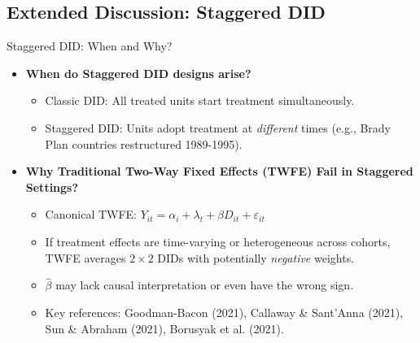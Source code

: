 \documentclass{beamer}
\begin{document}
\subsection{Extended Discussion: Staggered DID}
\begin{frame}{Staggered DID: When and Why?}
  \begin{itemize}
    \item \textbf{When do Staggered DID designs arise?}
    \begin{itemize}
        \item Classic DID: All treated units start treatment simultaneously.
        \item Staggered DID: Units adopt treatment at \textit{different} times (e.g., Brady Plan countries restructured 1989-1995).
    \end{itemize}
    \item \textbf{Why Traditional Two-Way Fixed Effects (TWFE) Fail in Staggered Settings?}
    \begin{itemize}
        \item Canonical TWFE: $Y_{it} = \alpha_i + \lambda_t + \beta D_{it} + \varepsilon_{it}$
        \item If treatment effects are time-varying or heterogeneous across cohorts, TWFE averages $2 \times 2$ DIDs with potentially \textit{negative} weights.
        \item $\widehat{\beta}$ may lack causal interpretation or even have the wrong sign.
        \item Key references: Goodman-Bacon (2021), Callaway \& Sant'Anna (2021), Sun \& Abraham (2021), Borusyak et al. (2021).
    \end{itemize}
  \end{itemize}
\end{frame}
\end{document}
